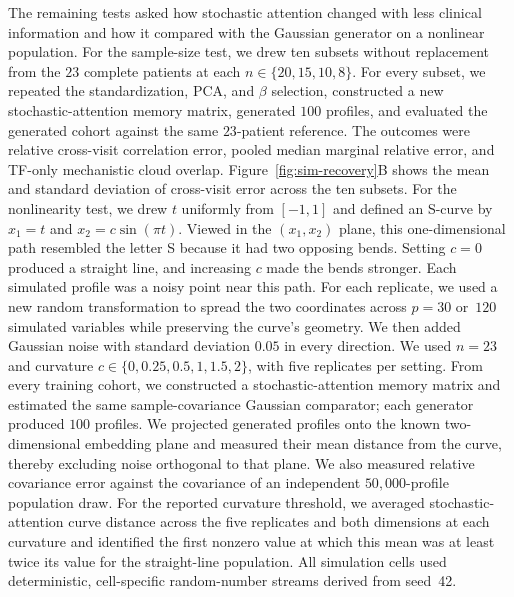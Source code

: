 The remaining tests asked how stochastic attention changed with less clinical
information and how it compared with the Gaussian generator on a nonlinear population. For
the sample-size test, we drew ten subsets without replacement from the $23$ complete patients
at each $n\in\{20,15,10,8\}$. For every subset, we repeated the standardization, PCA, and
$\beta$ selection, constructed a new stochastic-attention memory matrix, generated $100$
profiles, and evaluated the generated cohort against the same $23$-patient reference. The
outcomes were relative cross-visit correlation error, pooled median marginal relative error,
and TF-only mechanistic cloud overlap. Figure~\ref{fig:sim-recovery}B shows the mean and
standard deviation of cross-visit error across the ten subsets. For the nonlinearity test, we
drew $t$ uniformly from $[-1,1]$ and defined an S-curve by $x_1=t$ and
$x_2=c\sin(\pi t)$. Viewed in the $(x_1,x_2)$ plane, this one-dimensional path resembled the
letter S because it had two opposing bends. Setting $c{=}0$ produced a straight line, and
increasing $c$ made the bends stronger. Each simulated profile was a noisy point near this
path. For each replicate, we used a new random transformation to spread the two coordinates
across $p{=}30$ or~$120$ simulated variables while preserving the curve's geometry. We then
added Gaussian noise with standard deviation $0.05$ in every direction. We used $n{=}23$ and curvature
$c\in\{0,0.25,0.5,1,1.5,2\}$, with five replicates per setting. From every training cohort, we
constructed a stochastic-attention memory matrix and estimated the same sample-covariance
Gaussian comparator; each generator produced $100$ profiles. We projected generated profiles
onto the known two-dimensional embedding plane and measured their mean distance from the
curve, thereby excluding noise orthogonal to that plane. We also measured relative covariance
error against the covariance of an independent $50{,}000$-profile population draw. For
the reported curvature threshold, we averaged stochastic-attention curve distance across the
five replicates and both dimensions at each curvature and identified the first nonzero value at
which this mean was at least twice its value for the straight-line population. All simulation
cells used deterministic, cell-specific random-number streams derived from seed~42.
